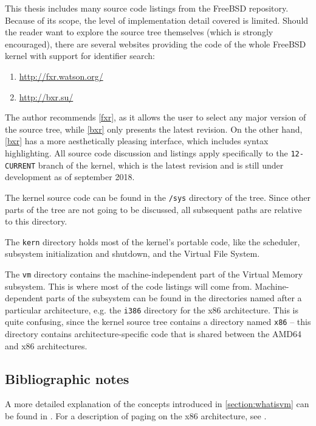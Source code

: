 \documentclass[shortabstract, english]{iithesis}
\begin{document}
This thesis includes many source code listings from the FreeBSD repository.
Because of its scope, the level of implementation detail covered is limited.
Should the reader want to explore the source tree themselves (which is strongly
encouraged), there are several websites providing the code of the whole FreeBSD
kernel with support for identifier search:
\begin{enumerate}[label=\textnormal{(\arabic*)}]
\item \url{http://fxr.watson.org/}\label{fxr}
\item \url{http://bxr.su/}\label{bxr}
\end{enumerate}

The author recommends \ref{fxr}, as it allows the user to select any major
version of the source tree, while \ref{bxr} only presents the latest revision.
On the other hand, \ref{bxr} has a more aesthetically pleasing interface, which
includes syntax highlighting. All source code discussion and listings apply
specifically to the \texttt{12-CURRENT} branch of the kernel, which is the
latest revision and is still under development as of september 2018.

The kernel source code can be found in the \texttt{/sys} directory of the tree.
Since other parts of the tree are not going to be discussed, all subsequent
paths are relative to this directory.

The \texttt{kern} directory holds most of the kernel's portable code, like the
scheduler, subsystem initialization and shutdown, and the Virtual File System.

The \texttt{vm} directory contains the machine-independent part of the Virtual
Memory subsystem. This is where most of the code listings will come from.
Machine-dependent parts of the subsystem can be found in the directories named
after a particular architecture, e.g. the \texttt{i386} directory for the x86
architecture. This is quite confusing, since the kernel source tree contains a
directory named \texttt{x86} -- this directory contains architecture-specific
code that is shared between the AMD64 and x86 architectures.

\subsection{Bibliographic notes}
A more detailed explanation of the concepts introduced in \ref{section:whatisvm}
can be found in \cite[Section~3.3]{bib:tanenbaum}. For a description of paging
on the x86 architecture, see \cite[Chapter~4]{bib:intel}.
\end{document}
